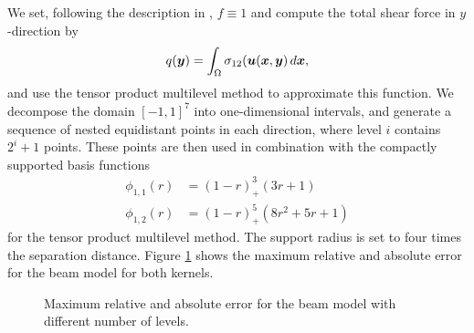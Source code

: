 \documentclass[	a4paper, 
								11pt]{article}
\theoremstyle{plain}
\begin{document}
We set, following the description in \cite{migliorati:ApproximationQOI}, $f \equiv 1$ and compute the total shear force in $y$-direction by
\begin{equation}
    q(\boldsymbol{y}) = \int_\Omega \sigma_{12}(\boldsymbol{u}(\boldsymbol{x}, \boldsymbol{y}) \mathop{d\boldsymbol{x}},
\end{equation}
and use the tensor product multilevel method to approximate this function. 
We decompose the domain $[-1, 1]^7$ into one-dimensional intervals, and generate a sequence of nested equidistant points in each direction, where level $i$ contains $2^i + 1$ points. These points are then used in combination with the compactly supported basis functions
\begin{align*}
    \phi_{1,1}(r) &= (1-r)^3_+(3r+1) \\
    \phi_{1,2}(r) &= (1-r)^5_+(8r^2+5r+1)
\end{align*}
for the tensor product multilevel method. The support radius is set to four times the separation distance. 
Figure \ref{fig:BeamRelativeError} shows the maximum relative and absolute error for the beam model for both kernels.

\begin{figure}
    \centering
    \caption{Maximum relative and absolute error for the beam model with different number of levels.}
    \label{fig:BeamRelativeError}
\end{figure}
\end{document}

